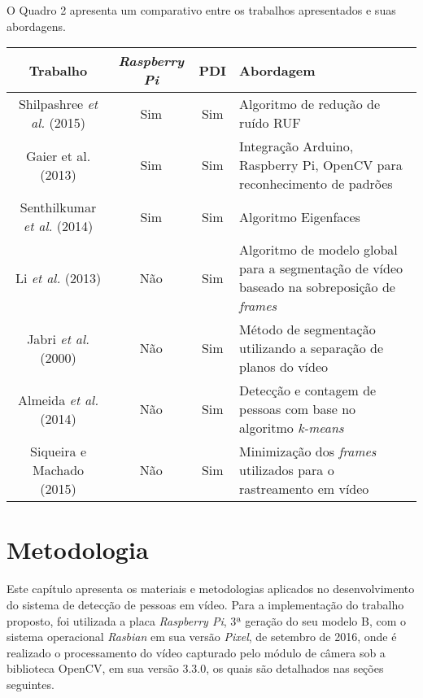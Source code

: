 \documentclass[12pt,oneside,a4paper,chapter=TITLE,section=TITLE,sumario=tradicional]{abntex2}
\begin{document}
O Quadro 2 apresenta um comparativo entre os trabalhos apresentados e suas abordagens.

\begin{quadro}[htb]
    \begin{tabular}{|c||c|c|p{4cm}|}
        \hline
        \textbf{Trabalho} & \textbf{\textit{Raspberry Pi}} & \textbf{PDI} & \textbf{Abordagem} \\ 
        \hline\hline
        Shilpashree \textit{et al.} (2015) & Sim    & Sim   & Algoritmo de redução de ruído RUF   \\ \hline
        Gaier et al. (2013)  & Sim    & Sim   & Integração Arduino, Raspberry Pi, OpenCV para reconhecimento de padrões    \\ \hline
        Senthilkumar \textit{et al.} (2014)   & Sim   & Sim  & Algoritmo Eigenfaces    \\ \hline
        Li \textit{et al.} (2013)  & Não    & Sim  & Algoritmo de modelo global para a segmentação de vídeo  baseado na sobreposição de \textit{frames}   \\ \hline
        Jabri \textit{et al.} (2000)  & Não    & Sim   & Método de segmentação utilizando a separação de planos do vídeo    \\ \hline
        Almeida \textit{et al.} (2014)  & Não    & Sim   & Detecção e contagem de pessoas com base no algoritmo \textit{k-means}    \\ \hline
        Siqueira e Machado (2015) & Não   & Sim  & Minimização dos \textit{frames} utilizados para o rastreamento em vídeo    \\ \hline
    \end{tabular}
    
\end{quadro}

\chapter{Metodologia}
\label{cap:metodologia}

Este capítulo apresenta os materiais e metodologias aplicados no desenvolvimento do sistema de detecção de pessoas em vídeo. Para a implementação do trabalho proposto, foi utilizada a placa \textit{Raspberry Pi}, 3ª geração do seu modelo B, com o sistema operacional \textit{Rasbian} em sua versão \textit{Pixel}, de setembro de 2016, onde é realizado o processamento do vídeo capturado pelo módulo de câmera sob a biblioteca OpenCV, em sua versão 3.3.0, os quais são detalhados nas seções seguintes.
\end{document}

